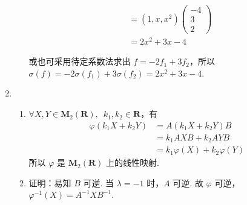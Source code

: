 \begin{enumerate}
\begin{enumerate}
\begin{align*}
                                  & = (1, x, x^2)
                        \begin{pmatrix} -4 \\ 3 \\ 2 \end{pmatrix}                          \\
                                  & = 2x^2 + 3x - 4
                    \end{align*}

                    或也可采用待定系数法求出 $ f = -2 f_1 + 3 f_2 $，所以 $ \sigma(f) = -2 \sigma(f_1) + 3 \sigma(f_2) = 2x^2 + 3x - 4 $.
          \end{enumerate}

    \item \begin{enumerate}
              \item $ \forall X, Y \in \mathbf{M}_2(\mathbf{R}),\enspace k_1, k_2 \in \mathbf{R} $，有
                    \begin{align*}
                        \varphi(k_1 X + k_2 Y) & = A(k_1 X + k_2 Y)B               \\
                                               & = k_1 A X B + k_2 A Y B           \\
                                               & = k_1 \varphi(X) + k_2 \varphi(Y)
                    \end{align*}
                    所以 $ \varphi $ 是 $ \mathbf{M}_2(\mathbf{R}) $ 上的线性映射.

              \item 证明：易知 $ B $ 可逆. 当 $ \lambda = -1 $ 时，$ A $ 可逆. 故 $ \varphi $ 可逆，$ \varphi^{-1}(X) = A^{-1} X B^{-1} $.


\end{enumerate}
\end{enumerate}
